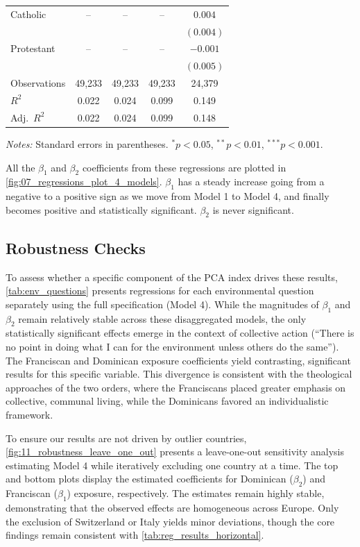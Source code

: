 \documentclass[12pt, a4paper]{article}
\begin{document}
\begin{table}[ht]
\begin{tabular}{lcccc}
Catholic 
& -- & -- & -- 
& $0.004$ \\
&  &  &  & $(0.004)$ \\
\addlinespace[0.2em]

Protestant 
& -- & -- & -- 
& $-0.001$ \\
&  &  &  & $(0.005)$ \\

\midrule

Observations 
& 49,233 & 49,233 & 49,233 & 24,379 \\

$R^2$ 
& 0.022 & 0.024 & 0.099 & 0.149 \\

Adj.\ $R^2$ 
& 0.022 & 0.024 & 0.099 & 0.148 \\
\bottomrule
\end{tabular}

\vspace{0.2em}
\scriptsize
\textit{Notes:} Standard errors in parentheses. 
$^{*}p<0.05$, $^{**}p<0.01$, $^{***}p<0.001$.
\end{table}

All the $\beta_1$ and $\beta_2$ coefficients from these regressions are plotted in \autoref{fig:07_regressions_plot_4_models}. $\beta_1$ has a steady 
increase going from a negative to a positive sign as we move from Model 1 to Model 4, and finally becomes positive 
and statistically significant. $\beta_2$ is never significant. 


\subsection{Robustness Checks}
To assess whether a specific component of the PCA index drives these results, \autoref{tab:env_questions} presents regressions for each environmental question separately using the full specification (Model 4). 
While the magnitudes of $\beta_1$ and $\beta_2$ remain relatively stable across these disaggregated models, the only statistically significant effects emerge in the context of collective action (``There is no point in doing what I can for the environment unless others do the same''). 
The Franciscan and Dominican exposure coefficients yield contrasting, significant results for this specific variable. 
This divergence is consistent with the theological approaches of the two orders, where the Franciscans placed greater emphasis on collective, communal living, while the Dominicans favored an individualistic framework.

To ensure our results are not driven by outlier countries, \autoref{fig:11_robustness_leave_one_out} presents a leave-one-out sensitivity analysis estimating Model 4 while iteratively excluding one country at a time. 
The top and bottom plots display the estimated coefficients for Dominican ($\beta_2$) and Franciscan ($\beta_1$) exposure, respectively. 
The estimates remain highly stable, demonstrating that the observed effects are homogeneous across Europe. 
Only the exclusion of Switzerland or Italy yields minor deviations, though the core findings remain consistent with \autoref{tab:reg_results_horizontal}.
\end{document}

